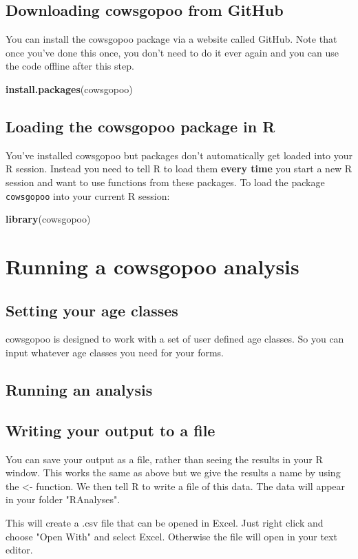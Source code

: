 \documentclass[12pt]{article}
\newcommand{\KeywordTok}[1]{\textcolor[rgb]{0.13,0.29,0.53}{\textbf{{#1}}}}
\newcommand{\NormalTok}[1]{{#1}}
\begin{document}
\subsection{Downloading cowsgopoo from GitHub}

You can install the cowsgopoo package via a website called GitHub. Note that once you've done this once, you don't need to do it ever again and you can use the code offline after this step.

\begin{snugshade}
\begin{Highlighting}[]
\KeywordTok{install.packages}\NormalTok{(cowsgopoo)}
\end{Highlighting}
\end{snugshade}

\subsection{Loading the cowsgopoo package in R}

You've installed cowsgopoo but packages don't automatically get loaded
into your R session. Instead you need to tell R to load them \textbf{every
time} you start a new R session and want to use functions from these
packages. To load the package \texttt{cowsgopoo} into your current R session:

\begin{snugshade}
\begin{Highlighting}[]
\KeywordTok{library}\NormalTok{(cowsgopoo)}
\end{Highlighting}
\end{snugshade}

\section{Running a cowsgopoo analysis}

\subsection{Setting your age classes}

cowsgopoo is designed to work with a set of user defined age classes. So you can input whatever age classes you need for your forms. 

\subsection{Running an analysis}


\subsection{Writing your output to a file}

You can save your output as a file, rather than seeing the results in your R window. This works the same as above but we give the results a name by using the <- function. We then tell R to write a file of this data. The data will appear in your folder "RAnalyses".

This will create a .csv file that can be opened in Excel. Just right click and choose "Open With" and select Excel. Otherwise the file will open in your text editor.
\end{document}
